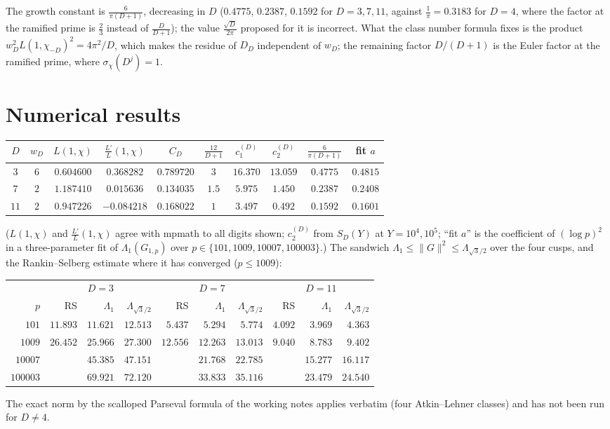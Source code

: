 \documentclass[11pt]{amsart}
\theoremstyle{remark}
\begin{document}
The growth constant is $\frac6{\pi(D+1)}$, decreasing in $D$ ($0.4775$, $0.2387$, $0.1592$ for $D=3,7,11$, against $\frac1\pi=0.3183$ for $D=4$, where the factor at the ramified prime is $\frac23$ instead of $\frac D{D+1}$); the value $\frac{\sqrt D}{2\pi}$ proposed for it is incorrect. What the class number formula fixes is the product $w_D^2L(1,\chi_{-D})^2=4\pi^2/D$, which makes the residue of $D_D$ independent of $w_D$; the remaining factor $D/(D+1)$ is the Euler factor at the ramified prime, where $\sigma_\chi(D^j)=1$.

\section{Numerical results}
\begin{center}\footnotesize\setlength{\tabcolsep}{4pt}
\begin{tabular}{c|cccc|ccc|cc}
\toprule
$D$ & $w_D$ & $L(1,\chi)$ & $\frac{L'}L(1,\chi)$ & $C_D$ & $\frac{12}{D+1}$ & $c_1^{(D)}$ & $c_2^{(D)}$ & $\frac6{\pi(D+1)}$ & fit $a$\\
\midrule
$3$ & $6$ & $0.604600$ & $0.368282$ & $0.789720$ & $3$ & $16.370$ & $13.059$ & $0.4775$ & $0.4815$\\
$7$ & $2$ & $1.187410$ & $0.015636$ & $0.134035$ & $1.5$ & $5.975$ & $1.450$ & $0.2387$ & $0.2408$\\
$11$ & $2$ & $0.947226$ & $-0.084218$ & $0.168022$ & $1$ & $3.497$ & $0.492$ & $0.1592$ & $0.1601$\\
\bottomrule
\end{tabular}
\end{center}
($L(1,\chi)$ and $\frac{L'}L(1,\chi)$ agree with mpmath to all digits shown; $c_2^{(D)}$ from $S_D(Y)$ at $Y=10^4,10^5$; ``fit $a$'' is the coefficient of $(\log p)^2$ in a three-parameter fit of $\Lambda_1(G_{1,p})$ over $p\in\{101,1009,10007,100003\}$.) The sandwich $\Lambda_1\le\|G\|^2\le\Lambda_{\sqrt3/2}$ over the four cusps, and the Rankin--Selberg estimate where it has converged ($p\le1009$):
\begin{center}\footnotesize\setlength{\tabcolsep}{4pt}
\begin{tabular}{r|rrr|rrr|rrr}
\toprule
 & \multicolumn{3}{c|}{$D=3$} & \multicolumn{3}{c|}{$D=7$} & \multicolumn{3}{c}{$D=11$}\\
$p$ & RS & $\Lambda_1$ & $\Lambda_{\sqrt3/2}$ & RS & $\Lambda_1$ & $\Lambda_{\sqrt3/2}$ & RS & $\Lambda_1$ & $\Lambda_{\sqrt3/2}$\\
\midrule
$101$ & $11.893$ & $11.621$ & $12.513$ & $5.437$ & $5.294$ & $5.774$ & $4.092$ & $3.969$ & $4.363$\\
$1009$ & $26.452$ & $25.966$ & $27.300$ & $12.556$ & $12.263$ & $13.013$ & $9.040$ & $8.783$ & $9.402$\\
$10007$ & & $45.385$ & $47.151$ & & $21.768$ & $22.785$ & & $15.277$ & $16.117$\\
$100003$ & & $69.921$ & $72.120$ & & $33.833$ & $35.116$ & & $23.479$ & $24.540$\\
\bottomrule
\end{tabular}
\end{center}
The exact norm by the scalloped Parseval formula of the working notes applies verbatim (four Atkin--Lehner classes) and has not been run for $D\ne4$.
\end{document}
